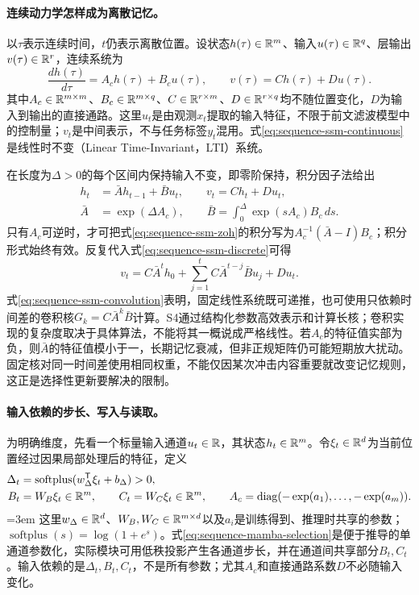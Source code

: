 \paragraph{连续动力学怎样成为离散记忆。}
以$\tau$表示连续时间，$t$仍表示离散位置。设状态$h(\tau)\in\mathbb{R}^m$、输入$u(\tau)\in\mathbb{R}^q$、层输出$v(\tau)\in\mathbb{R}^r$，连续系统为
\begin{equation}
 \frac{d h(\tau)}{d\tau}=A_c h(\tau)+B_c u(\tau),\qquad
 v(\tau)=Ch(\tau)+Du(\tau).
 \label{eq:sequence-ssm-continuous}
\end{equation}
其中$A_c\in\mathbb{R}^{m\times m}$、$B_c\in\mathbb{R}^{m\times q}$、$C\in\mathbb{R}^{r\times m}$、$D\in\mathbb{R}^{r\times q}$均不随位置变化，$D$为输入到输出的直接通路。这里$u_t$是由观测$x_t$提取的输入特征，不限于前文滤波模型中的控制量；$v_t$是中间表示，不与任务标签$y_t$混用。式\eqref{eq:sequence-ssm-continuous}是线性时不变（Linear Time-Invariant，LTI）系统。

在长度为$\Delta>0$的每个区间内保持输入不变，即零阶保持，积分因子法给出
\begin{align}
 h_t&=\bar A h_{t-1}+\bar B u_t,\qquad v_t=Ch_t+Du_t,
 \label{eq:sequence-ssm-discrete}\\
 \bar A&=\exp(\Delta A_c),\qquad
 \bar B=\int_0^\Delta\exp(sA_c)B_c\,ds.
 \label{eq:sequence-ssm-zoh}
\end{align}
只有$A_c$可逆时，才可把式\eqref{eq:sequence-ssm-zoh}的积分写为$A_c^{-1}(\bar A-I)B_c$；积分形式始终有效。反复代入式\eqref{eq:sequence-ssm-discrete}可得
\begin{equation}
 v_t=C\bar A^t h_0+\sum_{j=1}^t C\bar A^{t-j}\bar B u_j+Du_t.
 \label{eq:sequence-ssm-convolution}
\end{equation}
式\eqref{eq:sequence-ssm-convolution}表明，固定线性系统既可递推，也可使用只依赖时间差的卷积核$G_k=C\bar A^k\bar B$计算。S4通过结构化参数高效表示和计算长核；卷积实现的复杂度取决于具体算法，不能将其一概说成严格线性。若$A_c$的特征值实部为负，则$\bar A$的特征值模小于一，长期记忆衰减，但非正规矩阵仍可能短期放大扰动。固定核对同一时间差使用相同权重，不能仅因某次冲击内容重要就改变记忆规则，这正是选择性更新要解决的限制。

\paragraph{输入依赖的步长、写入与读取。}
为明确维度，先看一个标量输入通道$u_t\in\mathbb{R}$，其状态$h_t\in\mathbb{R}^m$。令$\xi_t\in\mathbb{R}^d$为当前位置经过因果局部处理后的特征，定义
\begin{align}
 \Delta_t&=\operatorname{softplus}(w_\Delta^{\mathsf T}\xi_t+b_\Delta)>0,
 \label{eq:sequence-mamba-selection}\\
 B_t&=W_B\xi_t\in\mathbb{R}^m,\qquad C_t=W_C\xi_t\in\mathbb{R}^m,\qquad
 A_c=\operatorname{diag}(-\exp(a_1),\ldots,-\exp(a_m)).\nonumber
\end{align}
\begingroup\emergencystretch=3em
这里$w_\Delta\in\mathbb{R}^d$、$W_B,W_C\in\mathbb{R}^{m\times d}$以及$a_i$是训练得到、推理时共享的参数；$\operatorname{softplus}(s)=\log(1+e^s)$。式\eqref{eq:sequence-mamba-selection}是便于推导的单通道参数化，实际模块可用低秩投影产生各通道步长，并在通道间共享部分$B_t,C_t$。输入依赖的是$\Delta_t,B_t,C_t$，不是所有参数；尤其$A_c$和直接通路系数$D$不必随输入变化。\par
\endgroup

